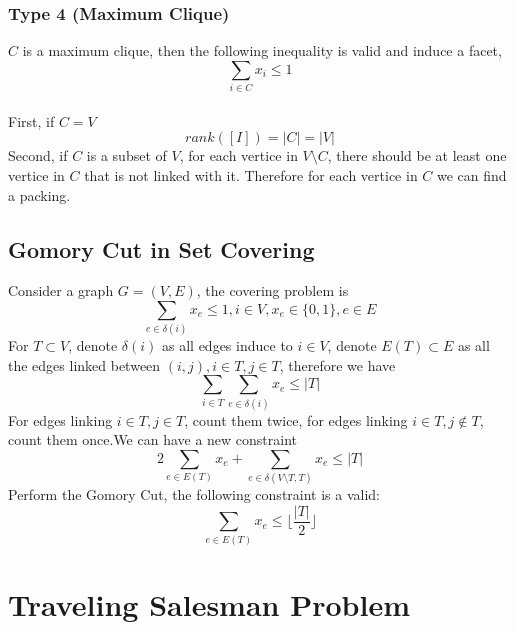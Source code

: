 			\subsection{Type 4 (Maximum Clique)}
				$C$ is a maximum clique, then the following inequality is valid and induce a facet,
				\begin{equation}
					\sum_{i\in C} x_i \le 1 
				\end{equation}
				\\
					First, if $C=V$
					\begin{equation}
						rank\left(\left[I\right]\right) = |C| = |V| 			
					\end{equation}
					Second, if $C$ is a subset of $V$, for each vertice in $V \setminus C$, there should be at least one vertice in $C$ that is not linked with it. Therefore for each vertice in $C$ we can find a packing.

		\section{Gomory Cut in Set Covering}
			Consider a graph $G=(V, E)$, the covering problem is
			\begin{equation}
				\sum_{e\in \delta(i)}x_e \le 1, i\in V, x_e\in \{0, 1\}, e\in E
			\end{equation}
			For $T\subset V$, denote $\delta(i)$ as all edges induce to $i\in V$, denote $E(T) \subset E$ as all the edges linked between $(i, j), i\in T, j\in T$, therefore we have
			\begin{equation}
				\sum_{i\in T}\sum_{e\in \delta(i)}x_e \le |T| 
			\end{equation}
			For edges linking $i \in T, j \in T$, count them twice, for edges linking $i\in T, j\notin T$, count them once.We can have a new constraint
			\begin{equation}
				2\sum_{e\in E(T)}x_e + \sum_{e\in \delta(V\setminus T, T)}x_e \le |T| 
			\end{equation}
			Perform the Gomory Cut, the following constraint is a valid:
			\begin{equation}
				\sum_{e\in E(T)}x_e \le \lfloor \frac{|T|}2 \rfloor 
			\end{equation}
						
	\chapter{Traveling Salesman Problem}
